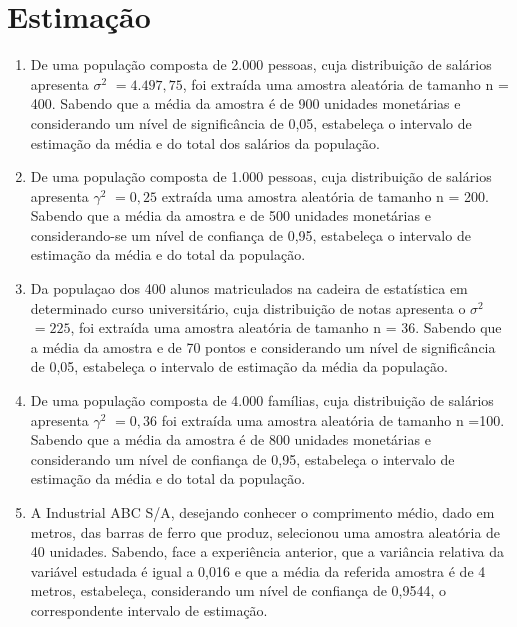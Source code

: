 \chapter{Estimação}

\begin{enumerate}[resume]

\item De uma população composta de 2.000 pessoas, cuja distribuição de salários apresenta $\sigma^{2}$  $= 4.497,75$, foi extraída uma amostra aleatória de tamanho n = 400. Sabendo que a média da amostra é de 900 unidades monetárias e considerando um nível de significância de 0,05, estabeleça o intervalo de estimação da média e do total dos salários da população.

\item De uma população composta de 1.000 pessoas, cuja distribuição de salários apresenta $\gamma^{2}$ $= 0,25$ extraída uma amostra aleatória de tamanho n = 200. Sabendo que a média da amostra e de 500 unidades monetárias e considerando-se um nível de confiança de 0,95, estabeleça o intervalo de estimação da média e do total da população.

\item Da populaçao dos 400 alunos matriculados na cadeira de estatística em determinado curso universitário, cuja distribuição de notas apresenta o $\sigma^{2}$  $=225$, foi extraída uma amostra aleatória de tamanho n = 36. Sabendo que a média da amostra e de 70 pontos e considerando um nível de significância de 0,05, estabeleça o intervalo de estimação da média da população.

\item  De uma população composta de 4.000 famílias, cuja distribuição de salários apresenta $\gamma^{2}$ $ =0, 36$ foi extraída uma amostra aleatória de tamanho n =100. Sabendo que a média da amostra é de 800 unidades monetárias e considerando um nível de confiança de 0,95, estabeleça o intervalo de estimação da média e do total da população.

\item A Industrial ABC S/A, desejando conhecer o comprimento médio, dado em metros, das barras de ferro que produz, selecionou uma amostra aleatória de 40 unidades. Sabendo, face a experiência anterior, que a variância relativa da variável estudada é igual a 0,016 e que a média da referida amostra é de 4 metros, estabeleça, considerando um nível de confiança de 0,9544, o correspondente intervalo de estimação.


\end{enumerate}
